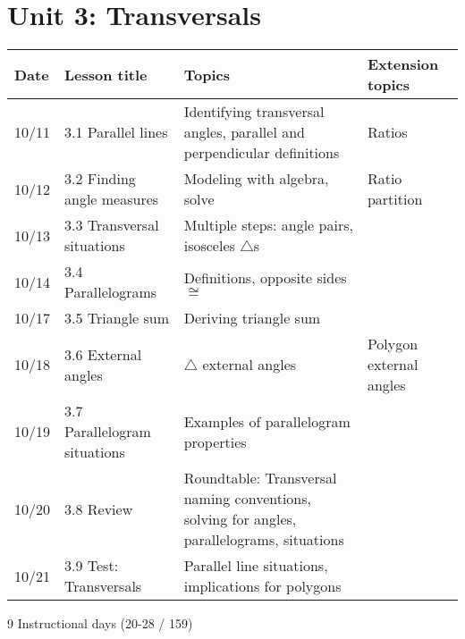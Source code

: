 \section*{Unit 3: Transversals}
\begin{tabular}{|p{0.9cm}|p{4cm}|p{7cm}|p{5cm}|}
  \hline
  Date & Lesson title & Topics  & Extension topics \\
  \hline
  10/11 & 3.1 Parallel lines & Identifying transversal angles, parallel and perpendicular definitions & Ratios \\
  \hline
  10/12 & 3.2 Finding angle measures & Modeling with algebra, solve & Ratio partition \\
  \hline
  10/13 & 3.3 Transversal situations & Multiple steps: angle pairs, isosceles $\triangle$s &  \\
  \hline
  10/14 & 3.4 Parallelograms & Definitions, opposite sides $\cong$ &  \\
  \hline
  10/17 & 3.5 Triangle sum & Deriving triangle sum &  \\
  \hline
  10/18 & 3.6 External angles & $\triangle$ external angles & Polygon external angles \\
  \hline
  10/19 & 3.7 Parallelogram situations & Examples of parallelogram properties &  \\
  \hline
  10/20 & 3.8 Review & Roundtable: Transversal naming conventions, solving for angles, parallelograms, situations & \\
  \hline
  10/21 & 3.9 Test: Transversals & Parallel line situations, implications for polygons &  \\
  \hline

\end{tabular} \par \vspace*{0.3cm}
9 Instructional days (20-28 / 159)


\newpage

